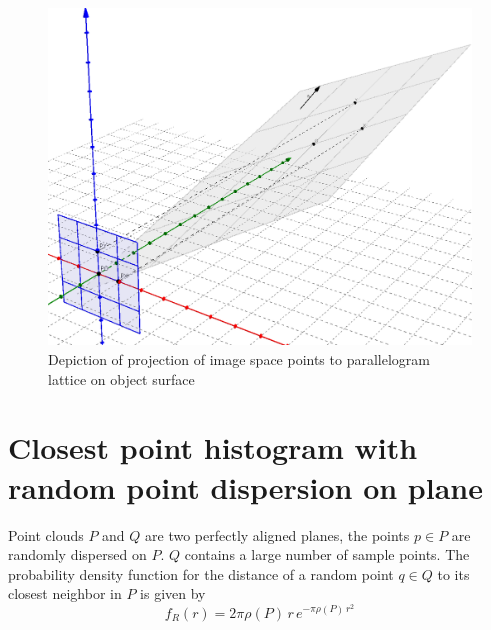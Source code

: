 \begin{figure}[h]
\centering
\includegraphics[width=.9\textwidth]{fig/lattice_proof.png}
\caption{Depiction of projection of image space points to parallelogram lattice on object surface}
\label{fig:lattice_proof}
\end{figure}




\section{Closest point histogram with random point dispersion on plane} \label{sec:proof_rand_disp_plane}
Point clouds $P$ and $Q$ are two perfectly aligned planes, the points $p \in P$ are randomly dispersed on $P$. $Q$ contains a large number of sample points. The probability density function for the distance of a random point $q \in Q$ to its closest neighbor in $P$ is given by
\begin{equation}
f_R(r) = 2 \pi \rho(P) \, r \, e^{-\pi \rho(P) \, r^2}
\end{equation}

